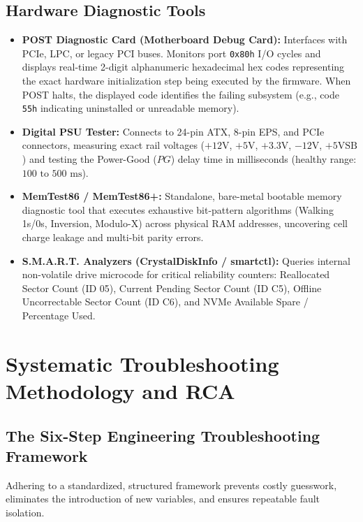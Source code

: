 \subsection{Hardware Diagnostic Tools}
\begin{itemize}[leftmargin=*]
    \item \textbf{POST Diagnostic Card (Motherboard Debug Card):} Interfaces with PCIe, LPC, or legacy PCI buses. Monitors port \texttt{0x80h} I/O cycles and displays real-time 2-digit alphanumeric hexadecimal hex codes representing the exact hardware initialization step being executed by the firmware. When POST halts, the displayed code identifies the failing subsystem (e.g., code \texttt{55h} indicating uninstalled or unreadable memory).
    \item \textbf{Digital PSU Tester:} Connects to 24-pin ATX, 8-pin EPS, and PCIe connectors, measuring exact rail voltages ($+12\text{V}$, $+5\text{V}$, $+3.3\text{V}$, $-12\text{V}$, $+5\text{VSB}$) and testing the Power-Good ($PG$) delay time in milliseconds (healthy range: $100\text{ to }500\text{ ms}$).
    \item \textbf{MemTest86 / MemTest86+:} Standalone, bare-metal bootable memory diagnostic tool that executes exhaustive bit-pattern algorithms (Walking 1s/0s, Inversion, Modulo-X) across physical RAM addresses, uncovering cell charge leakage and multi-bit parity errors.
    \item \textbf{S.M.A.R.T. Analyzers (CrystalDiskInfo / smartctl):} Queries internal non-volatile drive microcode for critical reliability counters: Reallocated Sector Count (ID 05), Current Pending Sector Count (ID C5), Offline Uncorrectable Sector Count (ID C6), and NVMe Available Spare / Percentage Used.
\end{itemize}

\section{Systematic Troubleshooting Methodology and RCA}

\subsection{The Six-Step Engineering Troubleshooting Framework}
Adhering to a standardized, structured framework prevents costly guesswork, eliminates the introduction of new variables, and ensures repeatable fault isolation.

